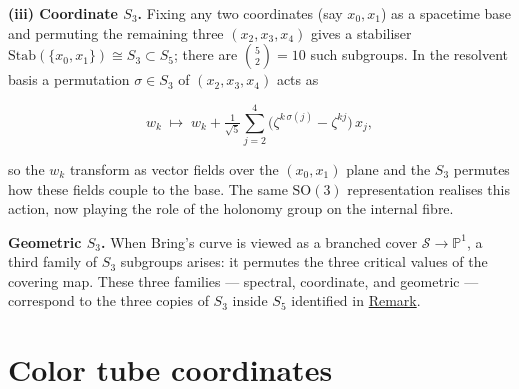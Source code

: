 \begin{remark}
\textbf{(iii) Coordinate $S_3$.}
Fixing any two coordinates (say $x_0,x_1$) as a spacetime base and
permuting the remaining three $(x_2,x_3,x_4)$ gives a stabiliser
$\mathrm{Stab}(\{x_0,x_1\})\cong S_3\subset S_5$; there are
$\binom{5}{2}=10$ such subgroups.  In the resolvent basis a
permutation $\sigma\in S_3$ of $(x_2,x_3,x_4)$ acts as

\begin{equation}\label{eq:coord-s3-shift}
  w_k\;\longmapsto\;
  w_k+\tfrac{1}{\sqrt{5}}\sum_{j=2}^{4}
    \bigl(\zeta^{k\,\sigma(j)}-\zeta^{kj}\bigr)\,x_j,
\end{equation}

so the $w_k$ transform as vector fields over the $(x_0,x_1)$ plane and
the $S_3$ permutes how these fields couple to the base.  The same
$\mathrm{SO}(3)$ representation realises this
action, now playing the role of the holonomy group on the internal
fibre.

\textbf{Geometric $S_3$.}
When Bring's curve is viewed as a branched cover
$\mathcal{S}\to\mathbb{P}^1$, a third family of $S_3$ subgroups arises:
it permutes the three critical values of the covering map.  These three
families --- spectral, coordinate, and geometric --- correspond to the
three copies of $S_3$ inside $S_5$ identified in
\hyperref[rem:chirality-trefoil]{Remark}.
\end{remark}

\section{Color tube coordinates}
\label{sec:color-tube}

